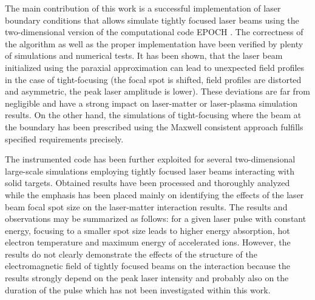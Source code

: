 The main contribution of this work is a successful implementation of laser boundary conditions that allows simulate tightly focused laser beams using the two-dimensional version of the computational code EPOCH \cite{bennett}. The correctness of the algorithm as well as the proper implementation have been verified by plenty of simulations and numerical tests. It has been shown, that the laser beam initialized using the paraxial approximation can lead to unexpected field profiles in the case of tight-focusing (the focal spot is shifted, field profiles are distorted and asymmetric, the peak laser amplitude is lower). These deviations are far from negligible and have a strong impact on laser-matter or laser-plasma simulation results. On the other hand, the simulations of tight-focusing where the beam at the boundary has been prescribed using the Maxwell consistent approach \cite{Thiele2016} fulfills specified requirements precisely.

The instrumented code has been further exploited for several two-dimensional large-scale simulations employing tightly focused laser beams interacting with solid targets. Obtained results have been processed and thoroughly analyzed while the emphasis has been placed mainly on identifying the effects of the laser beam focal spot size on the laser-matter interaction results. The results and observations may be summarized as follows: for a given laser pulse with constant energy, focusing to a smaller spot size leads to higher energy absorption, hot electron temperature and maximum energy of accelerated ions. However, the results do not clearly demonstrate the effects of the structure of the electromagnetic field of tightly focused beams on the interaction because the results strongly depend on the peak laser intensity and probably also on the duration of the pulse which has not been investigated within this work. 

